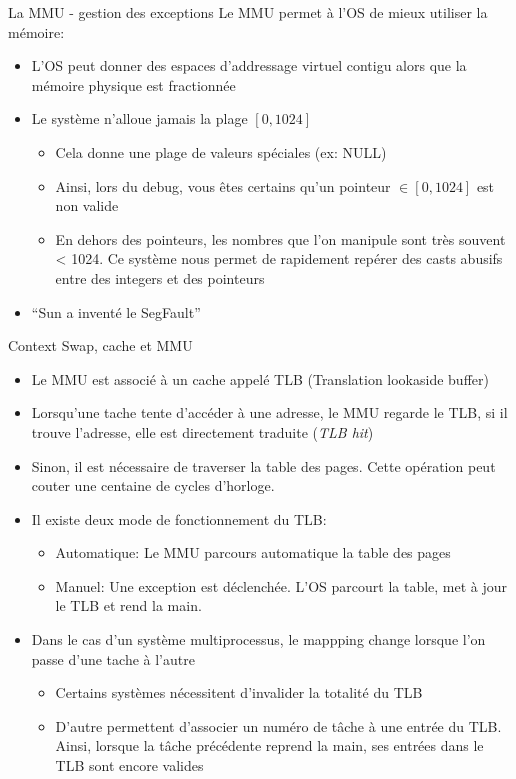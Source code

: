 \begin{frame}{La MMU - gestion des exceptions}
  Le MMU permet à l'OS de mieux utiliser la mémoire:
  \begin{itemize}
  \item  L'OS peut  donner  des espaces  d'addressage virtuel  contigu
    alors que la mémoire physique est fractionnée
  \item Le système n'alloue jamais la plage $[0, 1024]$
    \begin{itemize}
    \item Cela donne une plage de valeurs spéciales (ex: NULL)
    \item Ainsi, lors du debug, vous êtes certains qu'un pointeur $\in
      [0, 1024]$ est non valide
    \item En dehors des pointeurs,  les nombres que l'on manipule sont
      très  souvent <  1024.   Ce système  nous  permet de  rapidement
      repérer des casts abusifs entre des integers et des pointeurs
    \end{itemize}
  \item ``Sun a inventé le SegFault''
  \end{itemize}
\end{frame}

\begin{frame}[fragile=singleslide]{Context Swap, cache et MMU}
  \begin{itemize}
  \item  Le  MMU est  associé  à  un  cache appelé  TLB  (Translation
    lookaside buffer)
  \item  Lorsqu'une  tache tente  d'accéder  à  une  adresse, le  MMU
    regarde  le TLB,  si il  trouve l'adresse,  elle  est directement
    traduite (\emph{TLB hit})
  \item  Sinon,   il  est  nécessaire   de  traverser  la   table  des
    pages.  Cette  opération  peut   couter  une  centaine  de  cycles
    d'horloge.
  \item Il existe deux mode de fonctionnement du TLB:
    \begin{itemize}
    \item Automatique: Le MMU parcours automatique la table des pages
    \item  Manuel: Une  exception  est déclenchée.   L'OS parcourt  la
      table, met à jour le TLB et rend la main.
    \end{itemize}
  \item Dans  le cas d'un  système multiprocessus, le  mappping change
    lorsque l'on passe d'une tache à l'autre
    \begin{itemize}
    \item  Certains systèmes nécessitent  d'invalider la  totalité du
      TLB
    \item  D'autre permettent  d'associer  un numéro  de  tâche à  une
      entrée  du TLB. Ainsi,  lorsque la  tâche précédente  reprend la
      main, ses entrées dans le TLB sont encore valides
    \end{itemize}
  \end{itemize}
\end{frame}

